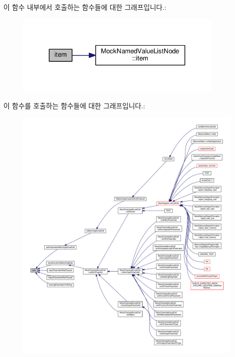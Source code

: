 이 함수 내부에서 호출하는 함수들에 대한 그래프입니다.\+:
\nopagebreak
\begin{figure}[H]
\begin{center}
\leavevmode
\includegraphics[width=287pt]{class_mock_checked_expected_call_ae28536adf55322e7d05d9484d9b3afda_cgraph}
\end{center}
\end{figure}




이 함수를 호출하는 함수들에 대한 그래프입니다.\+:
\nopagebreak
\begin{figure}[H]
\begin{center}
\leavevmode
\includegraphics[width=350pt]{class_mock_checked_expected_call_ae28536adf55322e7d05d9484d9b3afda_icgraph}
\end{center}
\end{figure}


